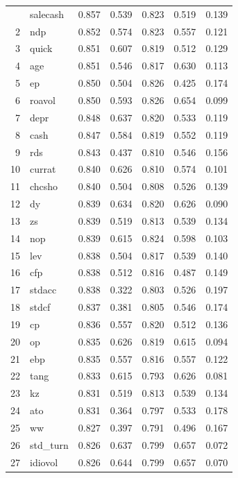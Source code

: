 \begin{footnotesize}
\begin{longtable}{rl|c|c|c|c|c}
		\hline\hline
		\endfoot
	1 & salecash & 0.857 & 0.539 & 0.823 & 0.519 & 0.139 \\ 
  2 & ndp & 0.852 & 0.574 & 0.823 & 0.557 & 0.121 \\ 
  3 & quick & 0.851 & 0.607 & 0.819 & 0.512 & 0.129 \\ 
  4 & age & 0.851 & 0.546 & 0.817 & 0.630 & 0.113 \\ 
  5 & ep & 0.850 & 0.504 & 0.826 & 0.425 & 0.174 \\ 
  6 & roavol & 0.850 & 0.593 & 0.826 & 0.654 & 0.099 \\ 
  7 & depr & 0.848 & 0.637 & 0.820 & 0.533 & 0.119 \\ 
  8 & cash & 0.847 & 0.584 & 0.819 & 0.552 & 0.119 \\ 
  9 & rds & 0.843 & 0.437 & 0.810 & 0.546 & 0.156 \\ 
  10 & currat & 0.840 & 0.626 & 0.810 & 0.574 & 0.101 \\ 
  11 & chcsho & 0.840 & 0.504 & 0.808 & 0.526 & 0.139 \\ 
  12 & dy & 0.839 & 0.634 & 0.820 & 0.626 & 0.090 \\ 
  13 & zs & 0.839 & 0.519 & 0.813 & 0.539 & 0.134 \\ 
  14 & nop & 0.839 & 0.615 & 0.824 & 0.598 & 0.103 \\ 
  15 & lev & 0.838 & 0.504 & 0.817 & 0.539 & 0.140 \\ 
  16 & cfp & 0.838 & 0.512 & 0.816 & 0.487 & 0.149 \\ 
  17 & stdacc & 0.838 & 0.322 & 0.803 & 0.526 & 0.197 \\ 
  18 & stdcf & 0.837 & 0.381 & 0.805 & 0.546 & 0.174 \\ 
  19 & cp & 0.836 & 0.557 & 0.820 & 0.512 & 0.136 \\ 
  20 & op & 0.835 & 0.626 & 0.819 & 0.615 & 0.094 \\ 
  21 & ebp & 0.835 & 0.557 & 0.816 & 0.557 & 0.122 \\ 
  22 & tang & 0.833 & 0.615 & 0.793 & 0.626 & 0.081 \\ 
  23 & kz & 0.831 & 0.519 & 0.813 & 0.539 & 0.134 \\ 
  24 & ato & 0.831 & 0.364 & 0.797 & 0.533 & 0.178 \\ 
  25 & ww & 0.827 & 0.397 & 0.791 & 0.496 & 0.167 \\ 
  26 & std\_turn & 0.826 & 0.637 & 0.799 & 0.657 & 0.072 \\ 
  27 & idiovol & 0.826 & 0.644 & 0.799 & 0.657 & 0.070 \\ 

\end{longtable}
\end{footnotesize}
